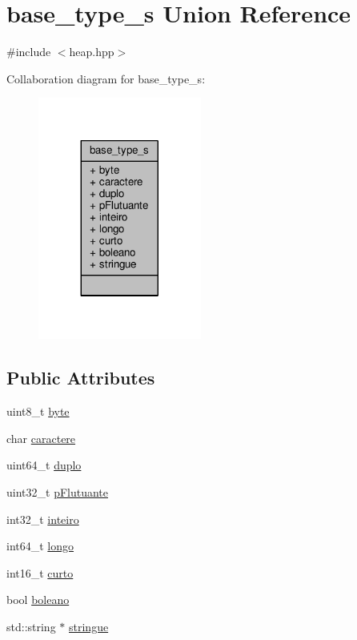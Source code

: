 \hypertarget{unionbase__type__s}{\section{base\+\_\+type\+\_\+s Union Reference}
\label{unionbase__type__s}
}


{\ttfamily \#include $<$heap.\+hpp$>$}



Collaboration diagram for base\+\_\+type\+\_\+s\+:\nopagebreak
\begin{figure}[H]
\begin{center}
\leavevmode
\includegraphics[width=152pt]{unionbase__type__s__coll__graph}
\end{center}
\end{figure}
\subsection*{Public Attributes}
\begin{DoxyCompactItemize}
\item 
uint8\+\_\+t \hyperlink{unionbase__type__s_a0764f45a4f066274e13342daba99a1a9}{byte}
\item 
char \hyperlink{unionbase__type__s_ae87ff5b2ecc7de22ab4012a8c4ee71b7}{caractere}
\item 
uint64\+\_\+t \hyperlink{unionbase__type__s_ad688d9e96a528dd0e80f39dbbfab695f}{duplo}
\item 
uint32\+\_\+t \hyperlink{unionbase__type__s_af0cda73dbc4e18d638ae083e0e19ea7e}{p\+Flutuante}
\item 
int32\+\_\+t \hyperlink{unionbase__type__s_aa8aa0d18e53aaef1b14d4c87779938ba}{inteiro}
\item 
int64\+\_\+t \hyperlink{unionbase__type__s_a1bcfa1e04911f2503e87dacad3d9fe21}{longo}
\item 
int16\+\_\+t \hyperlink{unionbase__type__s_a210f8a1effde127c16d34dd8d45f64e6}{curto}
\item 
bool \hyperlink{unionbase__type__s_a67bd49b04a984ad96792e5b22c8a1cf3}{boleano}
\item 
std\+::string $\ast$ \hyperlink{unionbase__type__s_ab246b2b35057f95ce992e7083086bae5}{stringue}
\end{DoxyCompactItemize}


